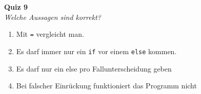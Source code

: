 \textbf{Quiz 9}\\
\textit{Welche Aussagen sind korrekt?}
\begin{enumerate}[label=\alph]
    \item Mit \texttt{=} vergleicht man.
    \item Es darf immer nur ein \texttt{if} vor einem \texttt{else} kommen.
    \item Es darf nur ein else pro Fallunterscheidung geben
    \item Bei falscher Einrückung funktioniert das Programm nicht
\end{enumerate}

